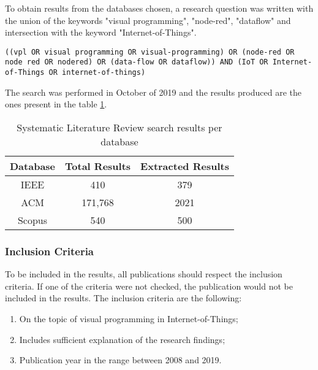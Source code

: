 To obtain results from the databases chosen, a research question was written with the union of the keywords "visual programming", "node-red", "dataflow" and intersection with the keyword "Internet-of-Things".

\noindent
\begin{lstlisting}[frame=none, numbers=none, backgroundcolor=\color{white},]
((vpl OR visual programming OR visual-programming) OR (node-red OR node red OR nodered) OR (data-flow OR dataflow)) AND (IoT OR Internet-of-Things OR internet-of-things)
\end{lstlisting}

The search was performed in October of 2019 and the results produced are the ones present in the table \ref{tab:slr_search_results}.

\captionsetup{belowskip=12pt,aboveskip=4pt}
\begin{table}[ht]
    \centering
    \caption{Systematic Literature Review search results per database}
    \begin{tabular}{| c | c | c |}
        \hline
        \textbf{Database} & \textbf{Total Results} & \textbf{Extracted Results}\\
        \hline
        IEEE & 410 & 379 \\
        \hline
        ACM & 171,768 & 2021 \\
        \hline
        Scopus & 540 & 500 \\
        \hline
    \end{tabular}
    \label{tab:slr_search_results}
\end{table}{}

\subsubsection{Inclusion Criteria}\label{sec:inclusion}

To be included in the results, all publications should respect the inclusion criteria. If one of the criteria were not checked, the publication would not be included in the results. The inclusion criteria are the following:

\begin{enumerate}
    \item On the topic of visual programming in Internet-of-Things;
    \item Includes sufficient explanation of the research findings;
    \item Publication year in the range between 2008 and 2019.
\end{enumerate}{}

